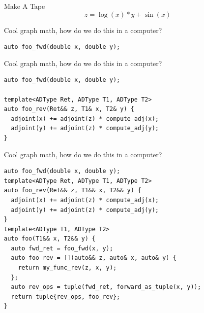 \documentclass[dvipsnames]{beamer}
\begin{document}
\begin{frame}{Make A Tape}
\vspace{-1mm}
$$z = \log(x) * y + \sin(x)$$

\end{frame}

\begin{frame}[fragile]{Cool graph math, how do we do this in a computer?}
\begin{verbatim}
auto foo_fwd(double x, double y);
\end{verbatim}
\end{frame}

\begin{frame}[fragile]{Cool graph math, how do we do this in a computer?}
\begin{verbatim}
auto foo_fwd(double x, double y);

template<ADType Ret, ADType T1, ADType T2>
auto foo_rev(Ret&& z, T1& x, T2& y) {
  adjoint(x) += adjoint(z) * compute_adj(x);
  adjoint(y) += adjoint(z) * compute_adj(y);
}
\end{verbatim}
\end{frame}

\begin{frame}[fragile]{Cool graph math, how do we do this in a computer?}
\begin{verbatim}
auto foo_fwd(double x, double y);
template<ADType Ret, ADType T1, ADType T2>
auto foo_rev(Ret&& z, T1&& x, T2&& y) {
  adjoint(x) += adjoint(z) * compute_adj(x);
  adjoint(y) += adjoint(z) * compute_adj(y);
}
template<ADType T1, ADType T2>
auto foo(T1&& x, T2&& y) {
  auto fwd_ret = foo_fwd(x, y);
  auto foo_rev = [](auto&& z, auto& x, auto& y) {
    return my_func_rev(z, x, y);
  };
  auto rev_ops = tuple(fwd_ret, forward_as_tuple(x, y));
  return tuple{rev_ops, foo_rev};
}
\end{verbatim}
\end{frame}
\end{document}
